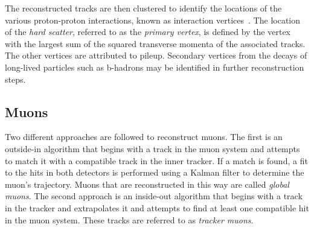 

The reconstructed tracks are then clustered to identify the locations of the 
various proton-proton interactions, known as interaction 
vertices~\cite{track-vertex}. 
The location of the \textit{hard scatter}, referred to as the \textit{primary 
vertex}, is defined by the vertex with the largest sum of the squared 
transverse momenta of the associated tracks. The other vertices are attributed 
to pileup. Secondary vertices from the decays of long-lived particles such as 
b-hadrons may be identified in further reconstruction steps.


\subsection{Muons}
Two different approaches are followed to reconstruct muons. The first is an 
outside-in algorithm that begins with a track in the muon system and attempts 
to match it with a compatible track in the inner tracker. If a match is found, 
a fit to the hits in both detectors is performed using a Kalman filter to 
determine the muon's trajectory. Muons that are reconstructed in this way are 
called \textit{global muons}. The second approach is an inside-out algorithm 
that begins with a track in the tracker and extrapolates it and attempts to 
find at least one compatible hit in the muon system. These tracks are referred 
to as \textit{tracker muons}.

